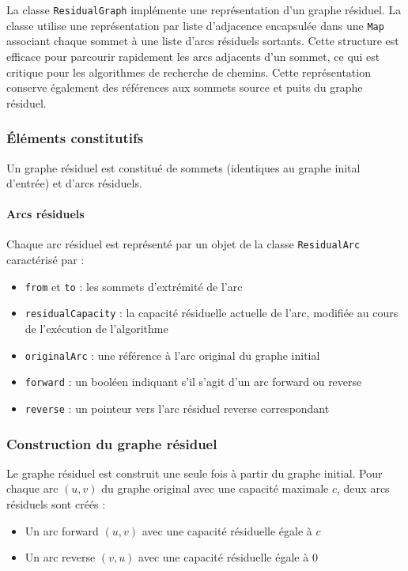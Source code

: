 \documentclass[titlepage]{article}
\begin{document}
La classe \texttt{ResidualGraph} implémente une représentation d'un graphe résiduel. La classe utilise une représentation par liste d'adjacence encapsulée dans une \texttt{Map} associant chaque sommet à une liste d'arcs résiduels sortants. Cette structure est efficace pour parcourir rapidement les arcs adjacents d'un sommet, ce qui est critique pour les algorithmes de recherche de chemins. Cette représentation conserve également des références aux sommets source et puits du graphe résiduel.

\subsubsection{Éléments constitutifs}

Un graphe résiduel est constitué de sommets (identiques au graphe inital d'entrée) et d'arcs résiduels.

\paragraph{Arcs résiduels} Chaque arc résiduel est représenté par un objet de la classe \texttt{ResidualArc} caractérisé par :

\begin{itemize}
    \item \texttt{from} et \texttt{to} : les sommets d'extrémité de l'arc
    \item \texttt{residualCapacity} : la capacité résiduelle actuelle de l'arc, modifiée au cours de l'exécution de l'algorithme
    \item \texttt{originalArc} : une référence à l'arc original du graphe initial
    \item \texttt{forward} : un booléen indiquant s'il s'agit d'un arc forward ou reverse
    \item \texttt{reverse} : un pointeur vers l'arc résiduel reverse correspondant
\end{itemize}

\subsubsection{Construction du graphe résiduel}

Le graphe résiduel est construit une seule fois à partir du graphe initial. Pour chaque arc $(u, v)$ du graphe original avec une capacité maximale $c$, deux arcs résiduels sont créés :

\begin{itemize}
    \item Un arc forward $(u, v)$ avec une capacité résiduelle égale à $c$
    \item Un arc reverse $(v, u)$ avec une capacité résiduelle égale à $0$
\end{itemize}
\end{document}
